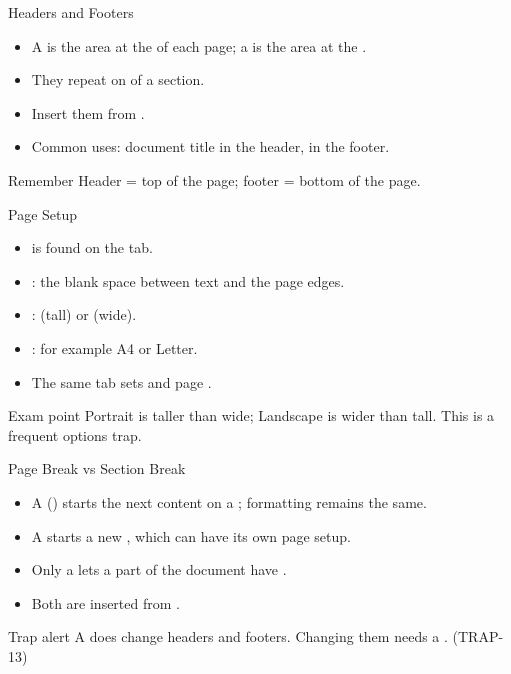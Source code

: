 \documentclass[aspectratio=169]{beamer}
\begin{document}
\begin{frame}{Headers and Footers}
  \begin{itemize}
    \item A  is the area at the  of each page; a
       is the area at the .
    \item They repeat on  of a section.
    \item Insert them from .
    \item Common uses: document title in the header,  in
      the footer.
  \end{itemize}
  \begin{block}{Remember}
    Header = top of the page; footer = bottom of the page.
  \end{block}
\end{frame}

\begin{frame}{Page Setup}
  \begin{itemize}
    \item {} is found on the  tab.
    \item {}: the blank space between text and the page edges.
    \item {}:  (tall) or 
      (wide).
    \item {}: for example A4 or Letter.
    \item The same tab sets  and page .
  \end{itemize}
  \begin{alertblock}{Exam point}
    Portrait is taller than wide; Landscape is wider than tall. This is a
    frequent options trap.
  \end{alertblock}
\end{frame}

\begin{frame}{Page Break vs Section Break}
  \begin{itemize}
    \item A  () starts the next content on a
      ; formatting remains the same.
    \item A  starts a new , which can have
      its own page setup.
    \item Only a  lets a part of the document have
      .
    \item Both are inserted from .
  \end{itemize}
  \begin{alertblock}{Trap alert}
    A  does  change headers and footers. Changing
    them needs a . (TRAP-13)
  \end{alertblock}
\end{frame}
\end{document}
